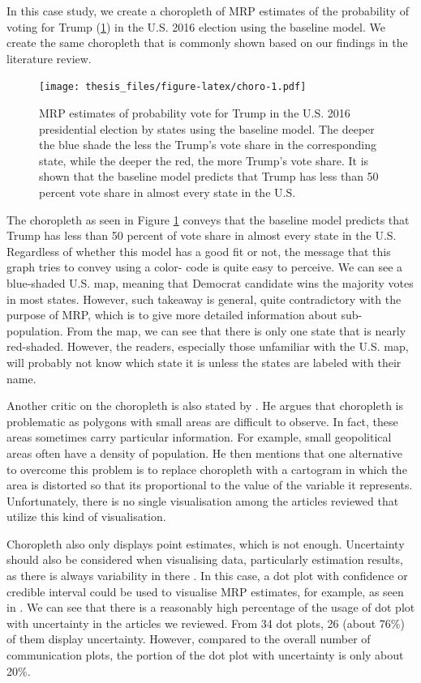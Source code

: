 \documentclass{monashthesis}
\begin{document}
In this case study, we create a choropleth of MRP estimates of the probability of voting for Trump (\ref{fig:choro}) in the U.S. 2016 election using the baseline model. We create the same choropleth that is commonly shown based on our findings in the literature review.

\begin{figure}
\centering
\texttt{[image: thesis\_files/figure-latex/choro-1.pdf]}
\caption{\label{fig:choro}MRP estimates of probability vote for Trump in the U.S. 2016 presidential election by states using the baseline model. The deeper the blue shade the less the Trump's vote share in the corresponding state, while the deeper the red, the more Trump's vote share. It is shown that the baseline model predicts that Trump has less than 50 percent vote share in almost every state in the U.S.}
\end{figure}

The choropleth as seen in Figure \ref{fig:choro} conveys that the baseline model predicts that Trump has less than 50 percent of vote share in almost every state in the U.S. Regardless of whether this model has a good fit or not, the message that this graph tries to convey using a color- code is quite easy to perceive. We can see a blue-shaded U.S. map, meaning that Democrat candidate wins the majority votes in most states. However, such takeaway is general, quite contradictory with the purpose of MRP, which is to give more detailed information about sub-population. From the map, we can see that there is only one state that is nearly red-shaded. However, the readers, especially those unfamiliar with the U.S. map, will probably not know which state it is unless the states are labeled with their name.

Another critic on the choropleth is also stated by \textcite{statgraph}. He argues that choropleth is problematic as polygons with small areas are difficult to observe. In fact, these areas sometimes carry particular information. For example, small geopolitical areas often have a density of population. He then mentions that one alternative to overcome this problem is to replace choropleth with a cartogram in which the area is distorted so that its proportional to the value of the variable it represents. Unfortunately, there is no single visualisation among the articles reviewed that utilize this kind of visualisation.

Choropleth also only displays point estimates, which is not enough. Uncertainty should also be considered when visualising data, particularly estimation results, as there is always variability in there \autocite{tukey,MIDWAY2020100141,HullmanJessica2019IPoE}. In this case, a dot plot with confidence or credible interval could be used to visualise MRP estimates, for example, as seen in \textcite{EnnsPeterK2013POit}. We can see that there is a reasonably high percentage of the usage of dot plot with uncertainty in the articles we reviewed. From 34 dot plots, 26 (about 76\%) of them display uncertainty. However, compared to the overall number of communication plots, the portion of the dot plot with uncertainty is only about 20\%.
\end{document}
